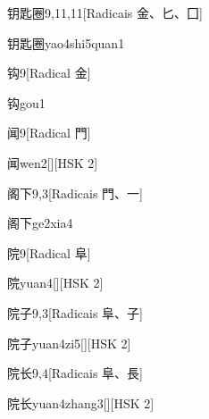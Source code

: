 \begin{entry}{钥匙圈}{9,11,11}[Radicais ⾦、⼔、⼞]
  \begin{phonetics}{钥匙圈}{yao4shi5quan1}
  \end{phonetics}
\end{entry}

\begin{entry}{钩}{9}[Radical ⾦]
  \begin{phonetics}{钩}{gou1}
  \end{phonetics}
\end{entry}

\begin{entry}{闻}{9}[Radical ⾨]
  \begin{phonetics}{闻}{wen2}[][HSK 2]
  \end{phonetics}
\end{entry}

\begin{entry}{阁下}{9,3}[Radicais ⾨、⼀]
  \begin{phonetics}{阁下}{ge2xia4}
  \end{phonetics}
\end{entry}

\begin{entry}{院}{9}[Radical ⾩]
  \begin{phonetics}{院}{yuan4}[][HSK 2]
  \end{phonetics}
\end{entry}

\begin{entry}{院子}{9,3}[Radicais ⾩、⼦]
  \begin{phonetics}{院子}{yuan4zi5}[][HSK 2]
  \end{phonetics}
\end{entry}

\begin{entry}{院长}{9,4}[Radicais ⾩、⾧]
  \begin{phonetics}{院长}{yuan4zhang3}[][HSK 2]
  \end{phonetics}
\end{entry}

